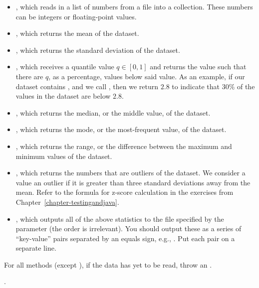 \begin{itemize}
    \item {}, which reads in a list of numbers from a file into a collection. These numbers can be integers or floating-point values.
    \item {}, which returns the mean of the dataset.
    \item {}, which returns the standard deviation of the dataset.
    \item {}, which receives a quantile value $q \in [0, 1]$ and returns the value such that there are $q$, as a percentage, values below said value. As an example, if our dataset contains , and we call , then we return $2.8$ to indicate that $30\%$ of the values in the dataset are below $2.8$. 
    \item {}, which returns the median, or the middle value, of the dataset.
    \item {}, which returns the mode, or the most-frequent value, of the dataset.
    \item {}, which returns the range, or the difference between the maximum and minimum values of the dataset.
    \item {}, which returns the numbers that are outliers of the dataset. We consider a value an outlier if it is greater than three standard deviations away from the mean. Refer to the formula for z-score calculation in the exercises from Chapter~\ref{chapter-testingandjava}.
    \item {}, which outputs all of the above statistics to the file specified by the parameter (the order is irrelevant). You should output these as a series of ``key-value'' pairs separated by an equals sign, e.g., . Put each pair on a separate line.
\end{itemize}

For all methods (except ), if the data has yet to be read, throw an . 

.

